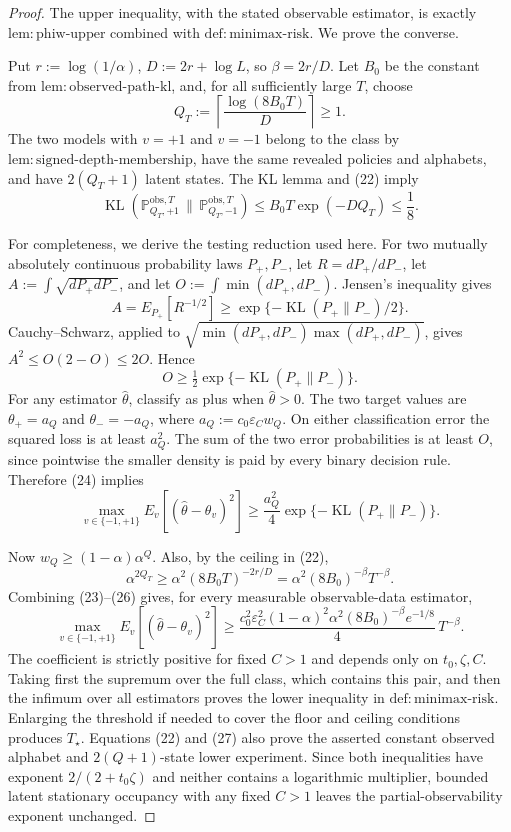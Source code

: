 \documentclass{article}
\begin{document}
\begin{proof}
The upper inequality, with the stated observable estimator, is exactly \(\mathrm{lem{:}phiw\text{-}upper}\) combined with \(\mathrm{def{:}minimax\text{-}risk}\).  We prove the converse.

Put \(r:=\log(1/\alpha)\), \(D:=2r+\log L\), so \(\beta=2r/D\).  Let \(B_0\) be the constant from \(\mathrm{lem{:}observed\text{-}path\text{-}kl}\), and, for all sufficiently large \(T\), choose
\[
 Q_T:=\left\lceil\frac{\log(8B_0T)}{D}\right\rceil\ge1. \tag{22}
\]
The two models with \(v=+1\) and \(v=-1\) belong to the class by \(\mathrm{lem{:}signed\text{-}depth\text{-}membership}\), have the same revealed policies and alphabets, and have \(2(Q_T+1)\) latent states.  The KL lemma and (22) imply
\[
 \operatorname{KL}(\mathbb P_{Q_T,+1}^{\mathrm{obs},T}\,\|\,
                    \mathbb P_{Q_T,-1}^{\mathrm{obs},T})
 \le B_0T\exp(-DQ_T)\le\frac18. \tag{23}
\]

For completeness, we derive the testing reduction used here.  For two mutually absolutely continuous probability laws \(P_+,P_-\), let \(R=dP_+/dP_-\), let
\(A:=\int\sqrt{dP_+dP_-}\), and let \(O:=\int\min(dP_+,dP_-)\).  Jensen's inequality gives
\[
 A=E_{P_+}[R^{-1/2}]
 \ge\exp\{-\operatorname{KL}(P_+\|P_-)/2\}.
\]
Cauchy--Schwarz, applied to \(\sqrt{\min(dP_+,dP_-)\max(dP_+,dP_-)}\), gives
\(A^2\le O(2-O)\le2O\).  Hence
\[
 O\ge\tfrac12\exp\{-\operatorname{KL}(P_+\|P_-)\}. \tag{24}
\]
For any estimator \(\widehat\theta\), classify as plus when \(\widehat\theta>0\).  The two target values are \(\theta_+=a_Q\) and \(\theta_-=-a_Q\), where
\(a_Q:=c_0\varepsilon_Cw_Q\).  On either classification error the squared loss is at least \(a_Q^2\).  The sum of the two error probabilities is at least \(O\), since pointwise the smaller density is paid by every binary decision rule.  Therefore (24) implies
\[
 \max_{v\in\{-1,+1\}}E_v[(\widehat\theta-\theta_v)^2]
 \ge\frac{a_Q^2}{4}\exp\{-\operatorname{KL}(P_+\|P_-)\}. \tag{25}
\]

Now \(w_Q\ge(1-\alpha)\alpha^Q\).  Also, by the ceiling in (22),
\[
 \alpha^{2Q_T}\ge \alpha^2(8B_0T)^{-2r/D}
 =\alpha^2(8B_0)^{-\beta}T^{-\beta}. \tag{26}
\]
Combining (23)--(26) gives, for every measurable observable-data estimator,
\[
 \max_{v\in\{-1,+1\}}E_v[(\widehat\theta-\theta_v)^2]
 \ge \frac{c_0^2\varepsilon_C^2(1-\alpha)^2\alpha^2
              (8B_0)^{-\beta}e^{-1/8}}{4}\,T^{-\beta}. \tag{27}
\]
The coefficient is strictly positive for fixed \(C>1\) and depends only on \(t_0,\zeta,C\).  Taking first the supremum over the full class, which contains this pair, and then the infimum over all estimators proves the lower inequality in \(\mathrm{def{:}minimax\text{-}risk}\).  Enlarging the threshold if needed to cover the floor and ceiling conditions produces \(T_\star\).  Equations (22) and (27) also prove the asserted constant observed alphabet and \(2(Q+1)\)-state lower experiment.  Since both inequalities have exponent \(2/(2+t_0\zeta)\) and neither contains a logarithmic multiplier, bounded latent stationary occupancy with any fixed \(C>1\) leaves the partial-observability exponent unchanged.
\end{proof}
\end{document}
